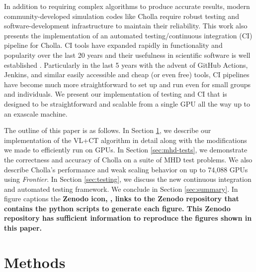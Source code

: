 \documentclass[modern, linenumbers]{aastex631}
\newcommand*{\img}[1]{%
    \raisebox{-.05\baselineskip}{%
        \texttt{[image: \#1]}%
    }%
}
\begin{document}
In addition to requiring complex algorithms to produce accurate results, modern community-developed simulation codes like Cholla require robust testing and software-development infrastructure to maintain their reliability. This work also presents the implementation of an automated testing/continuous integration (CI) pipeline for Cholla. CI tools have expanded rapidly in functionality and popularity over the last 20 years and their usefulness in scientific software is well established \citep{beck_1999, wilson_2014,wilson_2017}. Particularly in the last 5 years with the advent of GitHub Actions, Jenkins, and similar easily accessible and cheap (or even free) tools, CI pipelines have become much more straightforward to set up and run even for small groups and individuals. We present our implementation of testing and CI that is designed to be straightforward and scalable from a single GPU all the way up to an exascale machine.

The outline of this paper is as follows. In Section \ref{sec:methods}, we describe our implementation of the VL+CT algorithm in detail along with the modifications we made to efficiently run on GPUs. In Section \ref{sec:mhd-tests}, we demonstrate the correctness and accuracy of Cholla on a suite of MHD test problems. We also describe Cholla's performance and weak scaling behavior on up to 74,088 GPUs using \textit{Frontier}. In Section \ref{sec:testing}, we discuss the new continuous integration and automated testing framework. We conclude in Section \ref{sec:summary}. In figure captions the \textbf{Zenodo icon, \img{zenodo-gradient-200.png}, links to the Zenodo repository that contains the python scripts to generate each figure. This Zenodo repository has sufficient information to reproduce the figures shown in this paper.}


\section{Methods}
\label{sec:methods}

\end{document}
